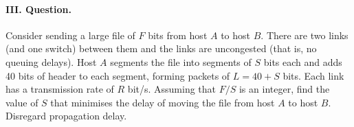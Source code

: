 
\paragraph{III. Question.}

Consider sending a large file of \(F\) bits from host \(A\) to host
\(B\). There are two links (and one switch) between them and the links
are uncongested (that is, no queuing delays). Host \(A\) segments the
file into segments of \(S\) bits each and adds 40 bits of header to
each segment, forming packets of \(L = 40 + S\) bits. Each link has a
transmission rate of \(R\) bit/s. Assuming that \(F/S\) is an integer,
find the value of \(S\) that minimises the delay of moving the file
from host \(A\) to host \(B\). Disregard propagation delay.
